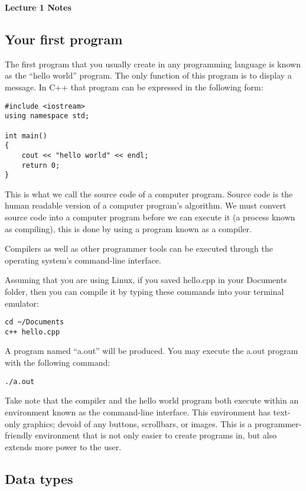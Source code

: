 \documentclass[a4paper,12pt]{article}
\begin{document}
\lstset{frame=single,tabsize=4,basicstyle=\ttfamily}

{\centering \bf \Large
Lecture 1 Notes \\[\baselineskip]
}

\subsection*{Your first program}

The first program that you usually create in any programming language is known as the ``hello world'' program. The only function of this program is to display a message. In C++ that program can be expressed in the following form:

\begin{lstlisting}[caption=hello.cpp]
#include <iostream>
using namespace std;

int main()
{
	cout << "hello world" << endl;
	return 0;
}
\end{lstlisting}

This is what we call the source code of a computer program. Source code is the human readable version of a computer program's algorithm. We must convert source code into a computer program before we can execute it (a process known as compiling), this is done by using a program known as a compiler. 

Compilers as well as other programmer tools can be executed through the operating system's command-line interface. 

Assuming that you are using Linux, if you saved hello.cpp in your Documents folder, then you can compile it by typing these commands into your terminal emulator:
\begin{lstlisting}
cd ~/Documents
c++ hello.cpp
\end{lstlisting}
A program named ``a.out'' will be produced.  You may execute the a.out program with the following command:
\begin{lstlisting}
./a.out
\end{lstlisting}

Take note that the compiler and the hello world program both execute within an environment known as the command-line interface. This environment has text-only graphics; devoid of any buttons, scrollbars, or images. This is a programmer-friendly environment that is not only easier to create programs in, but also extends more power to the user. 

\subsection*{Data types}
\end{document}
